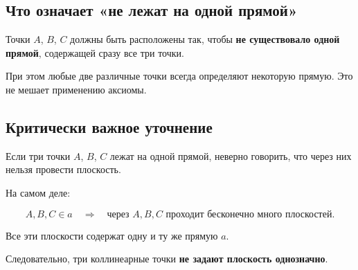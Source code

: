 \documentclass[a4paper,12pt]{article}
\newcommand{\important}[1]{\textbf{\textcolor{darkaccent}{#1}}}
\begin{document}
\begin{center}
\end{center}

\subsection*{\textcolor{accent}{Что означает «не лежат на одной прямой»}}

Точки $A$, $B$, $C$ должны быть расположены так, чтобы \textbf{не существовало одной прямой}, содержащей сразу все три точки.

При этом любые две различные точки всегда определяют некоторую прямую. Это не мешает применению аксиомы.

\subsection*{\textcolor{accent}{Критически важное уточнение}}

Если три точки $A$, $B$, $C$ лежат на одной прямой, неверно говорить, что через них нельзя провести плоскость.

На самом деле:

\[
A,B,C\in a
\quad\Longrightarrow\quad
\text{через }A,B,C\text{ проходит бесконечно много плоскостей}.
\]

Все эти плоскости содержат одну и ту же прямую $a$.

Следовательно, три коллинеарные точки \important{не задают плоскость однозначно}.

\end{document}

